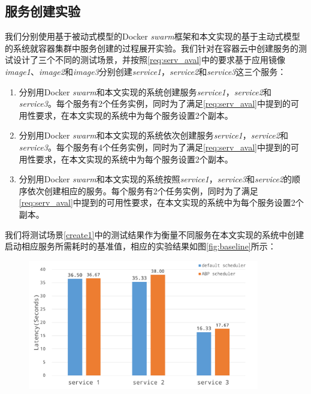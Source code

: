 \subsection{服务创建实验}\label{sec:serv_creation}
我们分别使用基于被动式模型的Docker \emph{swarm}框架和本文实现的基于主动式模型的系统就容器集群中服务创建的过程展开实验。我们针对在容器云中创建服务的测试设计了三个不同的测试场景，并按照\ref{req:serv_aval}中的要求基于应用镜像\emph{image1}、\emph{image2}和\emph{image3}分别创建\emph{service1}，\emph{service2}和\emph{service3}这三个服务：
\begin{enumerate}
\item\label{create1} 分别用Docker \emph{swarm}和本文实现的系统创建服务\emph{service1}，\emph{service2}和\emph{service3}。每个服务有2个任务实例，同时为了满足\ref{req:serv_aval}中提到的可用性要求，在本文实现的系统中为每个服务设置2个副本。
\item\label{create2} 分别用Docker \emph{swarm}和本文实现的系统依次创建服务\emph{service1}，\emph{service2}和\emph{service3}。每个服务有4个任务实例，同时为了满足\ref{req:serv_aval}中提到的可用性要求，在本文实现的系统中为每个服务设置2个副本。
\item\label{create3} 分别用Docker \emph{swarm}和本文实现的系统按照\emph{service1}，\emph{service3}和\emph{service2}的顺序依次创建相应的服务。每个服务有2个任务实例，同时为了满足\ref{req:serv_aval}中提到的可用性要求，在本文实现的系统中为每个服务设置2个副本。
\end{enumerate}

我们将测试场景\ref{create1}中的测试结果作为衡量不同服务在本文实现的系统中创建启动相应服务所需耗时的基准值，相应的实验结果如图\ref{fig:baseline}所示：
\begin{figure}[H]
\centering
\includegraphics[width=0.9\textwidth]{./figure/baseline}
\end{figure}

